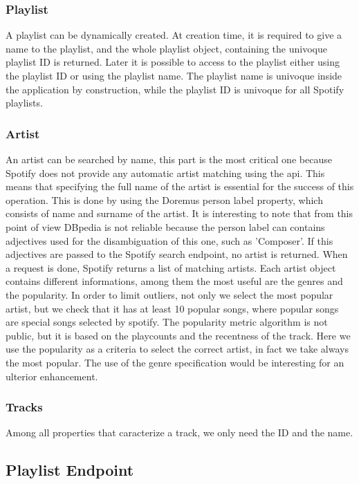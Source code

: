 \subsubsection{Playlist}
A playlist can be dynamically created. At creation time, it is required to give a name to the playlist, and the whole playlist object, containing the univoque playlist ID is returned. Later it is possible to access to the playlist either using the playlist ID or using the playlist name. The playlist name is univoque inside the application by construction, while the playlist ID is univoque for all Spotify playlists.
\subsubsection{Artist}
An artist can be searched by name, this part is the most critical one because Spotify does not provide any automatic artist matching using the api. This means that specifying the full name of the artist is essential for the success of this operation.
This is done by using the Doremus person label property, which consists of name and surname of the artist. It is interesting to note that from this point of view DBpedia is not reliable because the person label can contains adjectives used for the disambiguation of this one, such as 'Composer'. If this adjectives are passed to the Spotify search endpoint, no artist is returned.
When a request is done, Spotify returns a list of matching artists. Each artist object contains different informations, among them the most useful are the genres and the popularity. 
In order to limit outliers, not only we select the most popular artist, but we check that it has at least 10 popular songs, where popular songs are special songs selected by spotify. The popularity metric algorithm is not public, but it is based on the playcounts and the recentness of the track.
Here we use the popularity as a criteria to select the correct artist, in fact we take always the most popular. The use of the genre specification would be interesting for an ulterior enhancement.
\subsubsection{Tracks}
Among all properties that caracterize a track, we only need the ID and the name.

\subsection{Playlist Endpoint}
